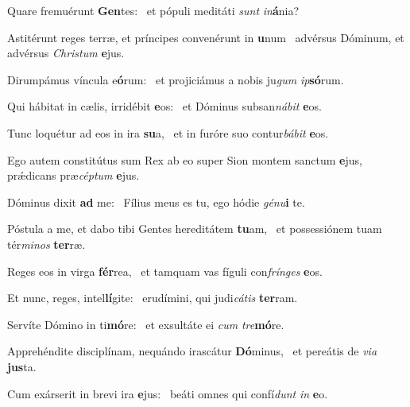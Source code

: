 \item Quare fremuérunt \textbf{Gen}tes:~\psstar{} et pópuli meditáti \textit{sunt} \textit{in}\textbf{á}nia?
\item Astitérunt reges terræ, et príncipes convenérunt in \textbf{u}num~\psstar{} advérsus Dóminum, et advérsus \textit{Christum} \textbf{e}jus.
\item Dirumpámus víncula e\textbf{ó}rum:~\psstar{} et projiciámus a nobis ju\textit{gum} \textit{ip}\textbf{só}rum.
\item Qui hábitat in cælis, irridébit \textbf{e}os:~\psstar{} et Dóminus subsan\textit{nábit} \textbf{e}os.
\item Tunc loquétur ad eos in ira \textbf{su}a,~\psstar{} et in furóre suo contur\textit{bábit} \textbf{e}os.
\item Ego autem constitútus sum Rex ab eo super Sion montem sanctum \textbf{e}jus,~\psstar{} prǽdicans præ\textit{céptum} \textbf{e}jus.
\item Dóminus dixit \textbf{ad} me:~\psstar{} Fílius meus es tu, ego hódie \textit{génu}\textbf{i} te.
\item Póstula a me, et dabo tibi Gentes hereditátem \textbf{tu}am,~\psstar{} et possessiónem tuam tér\textit{minos} \textbf{ter}ræ.
\item Reges eos in virga \textbf{fér}rea,~\psstar{} et tamquam vas fíguli con\textit{frínges} \textbf{e}os.
\item Et nunc, reges, intel\textbf{lí}gite:~\psstar{} erudímini, qui judi\textit{cátis} \textbf{ter}ram.
\item Servíte Dómino in ti\textbf{mó}re:~\psstar{} et exsultáte ei \textit{cum} \textit{tre}\textbf{mó}re.
\item Apprehéndite disciplínam, nequándo irascátur \textbf{Dó}minus,~\psstar{} et pereátis de \textit{via} \textbf{jus}ta.
\item Cum exárserit in brevi ira \textbf{e}jus:~\psstar{} beáti omnes qui confí\textit{dunt} \textit{in} \textbf{e}o.
